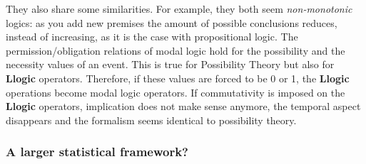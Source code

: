 \documentclass[
		twoside,openright,titlepage,numbers=noenddot,manychapters,
		headinclude,%
                footinclude=false,cleardoublepage=empty,
                BCOR=5mm,
		fontsize=11pt, %
                 enabledeprecatedfontcommands]{scrreprt}
\begin{document}


They also share some similarities. For example, they both seem  \emph{non-monotonic} logics: as you add new premises the amount of possible conclusions reduces, instead of increasing, as it is the case with propositional logic.  The permission/obligation relations of modal logic hold for the possibility and the necessity values of an event. This is true for Possibility Theory but also for \textbf{Llogic} operators. Therefore, if these values are forced to be 0 or 1, the \textbf{Llogic} operations become modal logic operators. If commutativity is imposed on the \textbf{Llogic} operators, implication does not make sense anymore, the temporal aspect disappears and the formalism seems identical to possibility theory.



\subsubsection{A larger  statistical framework?}

\end{document}
